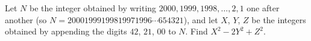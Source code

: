 Let $N$ be the integer obtained by writing $2000,1999,1998,\dots,2,1$ one after another (so $N=20001999199819971996\cdots654321$), and let $X$, $Y$, $Z$ be the integers obtained by appending the digits $42$, $21$, $00$ to $N$. Find $X^2-2Y^2+Z^2$.
